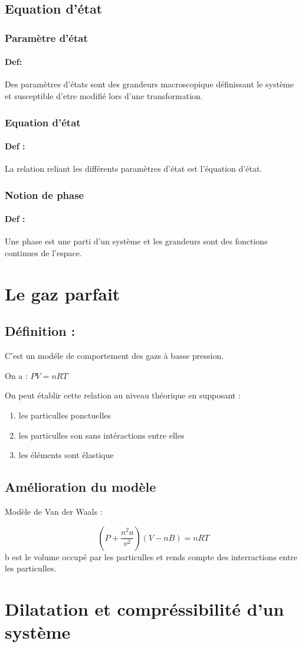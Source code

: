\documentclass[a4paper,10pt]{report}
\begin{document}
\subsection{Equation d'état}
\subsubsection{Paramètre d'état}
\paragraph{Def:}
Des paramètres d'états sont des grandeurs macroscopique définissant le système et susceptible d'etre modifié lors d'une transformation.

\subsubsection{Equation d'état}
\paragraph{Def :}
La relation reliant les différents paramètres d'état est l'équation d'état.

\subsubsection{Notion de phase}
\paragraph{Def :}
Une phase est une parti d'un système et les grandeurs sont des fonctions continues de l'espace.

\section{Le gaz parfait}
\subsection{Définition :}
C'est un modéle de comportement des gazs à basse pression.

On a : 
\begin{math}
 PV=nRT
\end{math}

On peut établir cette relation au niveau théorique en supposant :
\begin{enumerate}
 \item les particulles ponctuelles
 \item les particulles son sans intéractions entre elles
 \item les éléments sont élastique
\end{enumerate}
\subsection{Amélioration du modèle}
Modèle de Van der Waals :

\begin{equation}
 (P+\frac{n^2 a}{v^2})(V-nB)=nRT
\end{equation}
b est le volume occupé par les particulles et rends compte des interractions entre les particulles.

\section{Dilatation et compréssibilité d'un système}
\end{document}
